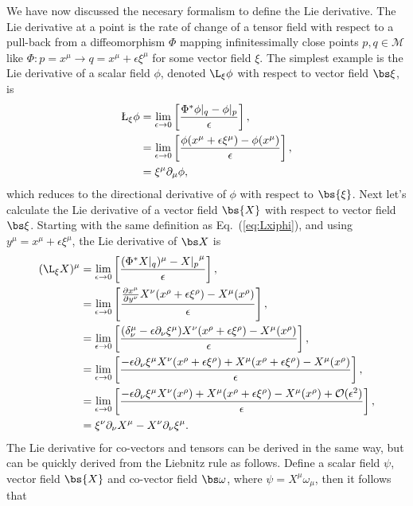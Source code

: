 We have now discussed the necesary formalism to define the Lie derivative. The Lie derivative at a point is the rate of change of a tensor field with respect to a pull-back from a diffeomorphism $\Phi$ mapping infinitessimally close points $p,q \in \mathcal{M}$ like $\Phi:p=x^\mu \rightarrow q = x^\mu+\epsilon \xi^\mu$ for some vector field $\xi$. The simplest example is the Lie derivative of a scalar field $\phi$, denoted $\L_\xi \phi$ with respect to vector field $\bs \xi$, is
\begin{align} \label{eq:Lxiphi}
\L_\xi \phi &= \lim_{\epsilon \rightarrow 0}\left[\frac{\Phi^*\phi\vert_q - \phi\vert_p}{\epsilon} \right] , \\
&= \lim_{\epsilon \rightarrow 0}\left[\frac{\phi(x^\mu + \epsilon \xi^\mu) - \phi(x^\mu)}{\epsilon} \right] , \\
&= \xi^\mu \partial_\mu \phi,
\end{align}
which reduces to the directional derivative of $\phi$ with respect to $\bs{\xi}$. Next let's calculate the Lie derivative of a vector field $\bs{X}$ with respect to vector field $\bs\xi$. Starting with the same definition as Eq.~(\ref{eq:Lxiphi}), and using $y^\mu = x^\mu + \epsilon \xi^\mu$, the Lie derivative of $\bs X$ is 
\begin{align} \label{eq:Lxiphi}
(\L_\xi {X})^\mu &= \lim_{\epsilon \rightarrow 0}\left[\frac{(\Phi^*X\vert_q)^\mu - {X\vert_p}^\mu}{\epsilon} \right] , \\
&= \lim_{\epsilon \rightarrow 0}\left[\frac{ \frac{\partial x^\mu}{\partial y^\nu}X^\nu(x^\rho + \epsilon \xi^\rho) - X^\mu(x^\rho)}{\epsilon} \right] , \\
&= \lim_{\epsilon \rightarrow 0}\left[\frac{ (\delta_\nu^\mu - \epsilon \partial_\nu \xi^\mu)X^\nu(x^\rho + \epsilon \xi^\rho) - X^\mu(x^\rho)}{\epsilon} \right] , \\
&= \lim_{\epsilon \rightarrow 0}\left[\frac{ - \epsilon \partial_\nu \xi^\mu X^\nu(x^\rho + \epsilon \xi^\rho)+ X^\mu(x^\rho + \epsilon \xi^\rho) - X^\mu(x^\rho)}{\epsilon}  \right] , \\
&= \lim_{\epsilon \rightarrow 0}\left[\frac{ - \epsilon \partial_\nu \xi^\mu X^\nu(x^\rho)+ X^\mu(x^\rho + \epsilon \xi^\rho) - X^\mu(x^\rho)+\mathcal{O}(\epsilon^2)}{\epsilon}  \right] , \\
&= \xi^\nu \partial_\nu X^\mu - X^\nu \partial_\nu \xi^\mu.
\end{align}
The Lie derivative for co-vectors and tensors can be derived in the same way, but can be quickly derived from the Liebnitz rule as follows. Define a scalar field $\psi$, vector field $\bs{X}$ and co-vector field $\bs\omega$, where $\psi = X^\mu \omega_\mu$, then it follows that
